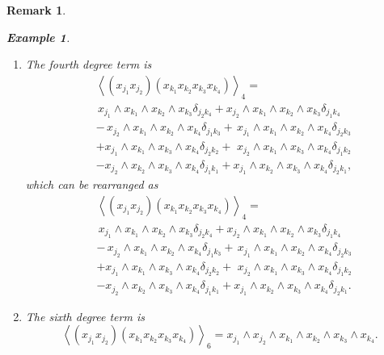 \documentclass[aps,preprint]{revtex4}%
\newtheorem{example}[theorem]{Example}
\newtheorem{remark}[theorem]{Remark}
\begin{document}
\begin{remark}
\begin{example}
\begin{enumerate}
\item The fourth degree term is
\begin{align}
&  \left\langle \left(  x_{j_{1}}x_{j_{2}}\right)  \left(  x_{k_{1}}x_{k_{2}%
}x_{k_{3}}x_{k_{4}}\right)  \right\rangle _{4}=\\
&  \,x_{j_{1}}\wedge x_{k_{1}}\wedge x_{k_{2}}\wedge x_{k_{3}}\delta
_{j_{2}k_{4}}+x_{j_{2}}\wedge x_{k_{1}}\wedge x_{k_{2}}\wedge x_{k_{3}}%
\delta_{j_{1}k_{4}}\,\\
&  -\,x_{j_{2}}\wedge x_{k_{1}}\wedge x_{k_{2}}\wedge x_{k_{4}}\delta
_{j_{1}k_{3}}+\,x_{j_{1}}\wedge x_{k_{1}}\wedge x_{k_{2}}\wedge x_{k_{4}%
}\delta_{j_{2}k_{3}}\\
&  +x_{j_{1}}\wedge x_{k_{1}}\wedge x_{k_{3}}\wedge x_{k_{4}}\delta
_{j_{2}k_{2}}+\,\,x_{j_{2}}\wedge x_{k_{1}}\wedge x_{k_{3}}\wedge x_{k_{4}%
}\delta_{j_{1}k_{2}}\\
&  -x_{j_{2}}\wedge x_{k_{2}}\wedge x_{k_{3}}\wedge x_{k_{4}}\delta
_{j_{1}k_{1}}+x_{j_{1}}\wedge x_{k_{2}}\wedge x_{k_{3}}\wedge x_{k_{4}}%
\delta_{j_{2}k_{1}},
\end{align}
which can be rearranged as%
\begin{align}
&  \left\langle \left(  x_{j_{1}}x_{j_{2}}\right)  \left(  x_{k_{1}}x_{k_{2}%
}x_{k_{3}}x_{k_{4}}\right)  \right\rangle _{4}=\\
&  \,x_{j_{1}}\wedge x_{k_{1}}\wedge x_{k_{2}}\wedge x_{k_{3}}\delta
_{j_{2}k_{4}}+x_{j_{2}}\wedge x_{k_{1}}\wedge x_{k_{2}}\wedge x_{k_{3}}%
\delta_{j_{1}k_{4}}\,\\
&  -\,x_{j_{2}}\wedge x_{k_{1}}\wedge x_{k_{2}}\wedge x_{k_{4}}\delta
_{j_{1}k_{3}}+\,x_{j_{1}}\wedge x_{k_{1}}\wedge x_{k_{2}}\wedge x_{k_{4}%
}\delta_{j_{2}k_{3}}\\
&  +x_{j_{1}}\wedge x_{k_{1}}\wedge x_{k_{3}}\wedge x_{k_{4}}\delta
_{j_{2}k_{2}}+\,\,x_{j_{2}}\wedge x_{k_{1}}\wedge x_{k_{3}}\wedge x_{k_{4}%
}\delta_{j_{1}k_{2}}\\
&  -x_{j_{2}}\wedge x_{k_{2}}\wedge x_{k_{3}}\wedge x_{k_{4}}\delta
_{j_{1}k_{1}}+x_{j_{1}}\wedge x_{k_{2}}\wedge x_{k_{3}}\wedge x_{k_{4}}%
\delta_{j_{2}k_{1}}.
\end{align}


\item The sixth degree term is%
\begin{equation}
\left\langle \left(  x_{j_{1}}x_{j_{2}}\right)  \left(  x_{k_{1}}x_{k_{2}%
}x_{k_{3}}x_{k_{4}}\right)  \right\rangle _{6}=x_{j_{1}}\wedge x_{j_{2}}\wedge
x_{k_{1}}\wedge x_{k_{2}}\wedge x_{k_{3}}\wedge x_{k_{4}}.
\end{equation}



\end{enumerate}
\end{example}
\end{remark}
\end{document}
